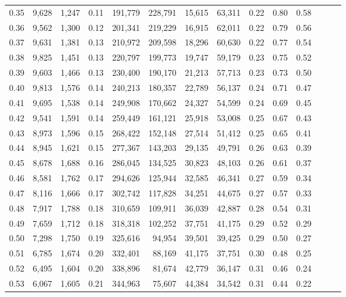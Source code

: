 \begin{tabular}{rrrrrrrrrrrrrr}
0.35 &  9,628 &  1,247 &  0.11 &  191,779 &  228,791 &  15,615 &  63,311 &  0.22 &  0.80 &      0.58 \\
0.36 &  9,562 &  1,300 &  0.12 &  201,341 &  219,229 &  16,915 &  62,011 &  0.22 &  0.79 &      0.56 \\
0.37 &  9,631 &  1,381 &  0.13 &  210,972 &  209,598 &  18,296 &  60,630 &  0.22 &  0.77 &      0.54 \\
0.38 &  9,825 &  1,451 &  0.13 &  220,797 &  199,773 &  19,747 &  59,179 &  0.23 &  0.75 &      0.52 \\
0.39 &  9,603 &  1,466 &  0.13 &  230,400 &  190,170 &  21,213 &  57,713 &  0.23 &  0.73 &      0.50 \\
0.40 &  9,813 &  1,576 &  0.14 &  240,213 &  180,357 &  22,789 &  56,137 &  0.24 &  0.71 &      0.47 \\
0.41 &  9,695 &  1,538 &  0.14 &  249,908 &  170,662 &  24,327 &  54,599 &  0.24 &  0.69 &      0.45 \\
0.42 &  9,541 &  1,591 &  0.14 &  259,449 &  161,121 &  25,918 &  53,008 &  0.25 &  0.67 &      0.43 \\
0.43 &  8,973 &  1,596 &  0.15 &  268,422 &  152,148 &  27,514 &  51,412 &  0.25 &  0.65 &      0.41 \\
0.44 &  8,945 &  1,621 &  0.15 &  277,367 &  143,203 &  29,135 &  49,791 &  0.26 &  0.63 &      0.39 \\
0.45 &  8,678 &  1,688 &  0.16 &  286,045 &  134,525 &  30,823 &  48,103 &  0.26 &  0.61 &      0.37 \\
0.46 &  8,581 &  1,762 &  0.17 &  294,626 &  125,944 &  32,585 &  46,341 &  0.27 &  0.59 &      0.34 \\
0.47 &  8,116 &  1,666 &  0.17 &  302,742 &  117,828 &  34,251 &  44,675 &  0.27 &  0.57 &      0.33 \\
0.48 &  7,917 &  1,788 &  0.18 &  310,659 &  109,911 &  36,039 &  42,887 &  0.28 &  0.54 &      0.31 \\
0.49 &  7,659 &  1,712 &  0.18 &  318,318 &  102,252 &  37,751 &  41,175 &  0.29 &  0.52 &      0.29 \\
0.50 &  7,298 &  1,750 &  0.19 &  325,616 &   94,954 &  39,501 &  39,425 &  0.29 &  0.50 &      0.27 \\
0.51 &  6,785 &  1,674 &  0.20 &  332,401 &   88,169 &  41,175 &  37,751 &  0.30 &  0.48 &      0.25 \\
0.52 &  6,495 &  1,604 &  0.20 &  338,896 &   81,674 &  42,779 &  36,147 &  0.31 &  0.46 &      0.24 \\
0.53 &  6,067 &  1,605 &  0.21 &  344,963 &   75,607 &  44,384 &  34,542 &  0.31 &  0.44 &      0.22 \\

\end{tabular}
